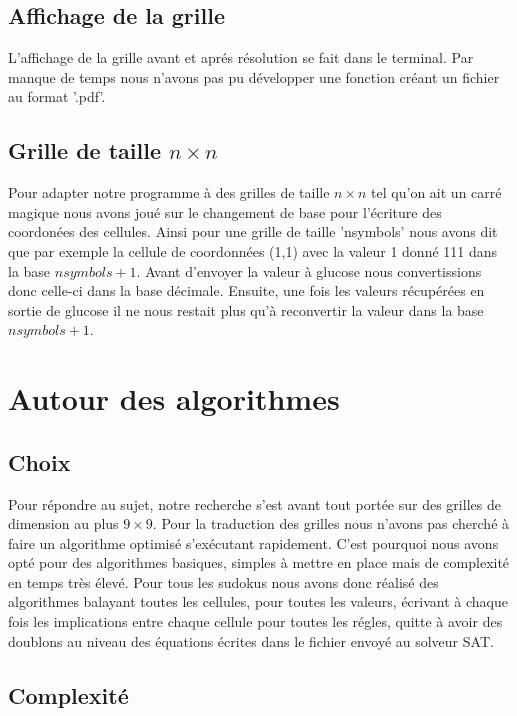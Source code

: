 \documentclass[a4paper,8pt,french,fleqn]{article}
\begin{document}
\subsection{Affichage de la grille}

L'affichage de la grille avant et aprés résolution se fait dans le terminal. Par manque de temps nous n'avons pas pu développer une fonction créant un fichier au format '.pdf'.

\subsection{Grille de taille $n \times n$}

Pour adapter notre programme à des grilles de taille $n \times n$ tel qu'on ait un carré magique nous avons joué sur le changement de base pour l'écriture des coordonées des cellules. Ainsi pour une grille de taille 'nsymbols' nous avons dit que par exemple la cellule de coordonnées (1,1) avec la valeur 1 donné 111 dans la base $nsymbols + 1$. Avant d'envoyer la valeur à glucose nous convertissions donc celle-ci dans la base décimale. Ensuite, une fois les valeurs récupérées en sortie de glucose il ne nous restait plus qu'à reconvertir la valeur dans la base $nsymbols + 1$.

\newpage

\section{Autour des algorithmes}

\subsection{Choix}

Pour répondre au sujet, notre recherche s'est avant tout portée sur des grilles de dimension au plus $9 \times 9$. Pour la traduction des grilles nous n'avons pas cherché à faire un algorithme optimisé s'exécutant rapidement. C'est pourquoi nous avons opté pour des algorithmes basiques, simples à mettre en place mais de complexité en temps très élevé. Pour tous les sudokus nous avons donc réalisé des algorithmes balayant toutes les cellules, pour toutes les valeurs, écrivant à chaque fois les implications entre chaque cellule pour toutes les régles, quitte à avoir des doublons au niveau des équations écrites dans le fichier envoyé au solveur SAT.

\subsection{Complexité}
\end{document}
